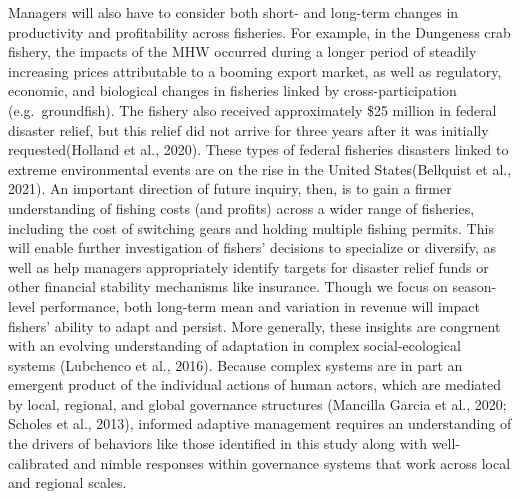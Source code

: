 \documentclass[]{elsarticle} %
\begin{document}
Managers will also have to consider both short- and long-term changes in
productivity and profitability across fisheries. For example, in the
Dungeness crab fishery, the impacts of the MHW occurred during a longer
period of steadily increasing prices attributable to a booming export
market, as well as regulatory, economic, and biological changes in
fisheries linked by cross-participation (e.g.~groundfish). The fishery
also received approximately \$25 million in federal disaster relief, but
this relief did not arrive for three years after it was initially
requested(Holland et al., 2020). These types of federal fisheries
disasters linked to extreme environmental events are on the rise in the
United States(Bellquist et al., 2021). An important direction of future
inquiry, then, is to gain a firmer understanding of fishing costs (and
profits) across a wider range of fisheries, including the cost of
switching gears and holding multiple fishing permits. This will enable
further investigation of fishers' decisions to specialize or diversify,
as well as help managers appropriately identify targets for disaster
relief funds or other financial stability mechanisms like insurance.
Though we focus on season-level performance, both long-term mean and
variation in revenue will impact fishers' ability to adapt and persist.
More generally, these insights are congruent with an evolving
understanding of adaptation in complex social-ecological systems
(Lubchenco et al., 2016). Because complex systems are in part an
emergent product of the individual actions of human actors, which are
mediated by local, regional, and global governance structures (Mancilla
Garcia et al., 2020; Scholes et al., 2013), informed adaptive management
requires an understanding of the drivers of behaviors like those
identified in this study along with well-calibrated and nimble responses
within governance systems that work across local and regional scales.
\end{document}

